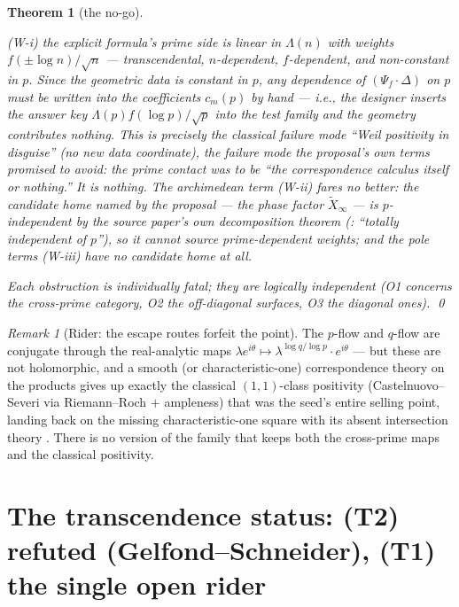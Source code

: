 \documentclass[11pt]{article}
\newtheorem{theorem}{Theorem}
\theoremstyle{definition}
\theoremstyle{remark}
\newtheorem*{remarkunnum}{Remark}
\begin{document}
\begin{theorem}[the no-go]
\begin{itemize}
\textup{(W-i)} the explicit formula's prime side is linear in $\Lambda(n)$
with weights $f(\pm\log n)/\sqrt{n}$ --- transcendental, $n$-dependent,
$f$-dependent, and non-constant in $p$. Since the geometric data is constant
in $p$, \emph{any} dependence of $(\Psi_f\cdot\Delta)$ on $p$ must be
written into the coefficients $c_m(p)$ by hand --- i.e., the designer
inserts the answer key $\Lambda(p) f(\log p)/\sqrt{p}$ into the test family
and the geometry contributes nothing. This is precisely the classical
failure mode ``Weil positivity in disguise'' (no new data coordinate), the
failure mode the proposal's own terms promised to avoid: the prime contact
was to be ``the correspondence calculus itself or nothing.'' It is nothing.
The archimedean term \textup{(W-ii)} fares no better: the candidate home
named by the proposal --- the phase factor $\widetilde{X}_\infty$ --- is
$p$-independent \emph{by the source paper's own decomposition theorem}
(\cite[Thm.~5 and \S4.3]{CC26}: ``totally independent of $p$''), so it
cannot source prime-dependent weights; and the pole terms \textup{(W-iii)}
have no candidate home at all.
\end{itemize}
Each obstruction is individually fatal; they are logically independent
(\textup{O1} concerns the cross-prime category, \textup{O2} the off-diagonal
surfaces, \textup{O3} the diagonal ones). \qed
\end{theorem}

\begin{remarkunnum}[Rider: the escape routes forfeit the point]
The $p$-flow and $q$-flow are conjugate through the real-analytic maps
$\lambda e^{i\theta} \mapsto \lambda^{\log q/\log p}\cdot e^{i\theta}$ ---
but these are not holomorphic, and a smooth (or characteristic-one)
correspondence theory on the products gives up exactly the classical
$(1,1)$-class positivity (Castelnuovo--Severi via Riemann--Roch $+$
ampleness) that was the seed's entire selling point, landing back on the
missing characteristic-one square with its absent intersection theory
\cite[\S4.3.2]{CE15}. There is no version of the family that keeps both the
cross-prime maps and the classical positivity.
\end{remarkunnum}

\section{The transcendence status: (T2) refuted (Gelfond--Schneider), (T1)
the single open rider}
\label{sec:transcendence}
\end{document}
